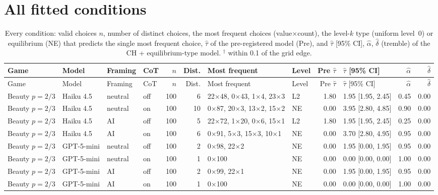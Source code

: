 \documentclass[11pt]{article}
\begin{document}
\section{All fitted conditions}\label{app:cells}
\footnotesize
\setlength{\tabcolsep}{1.8pt}
\begin{longtable}{@{}llllrrp{2.3cm}lrlrr@{}}
\caption{Every condition: valid choices $n$, number of distinct choices, the most frequent choices (value$\times$count), the level-$k$ type (uniform level~0) or equilibrium (NE) that predicts the single most frequent choice, $\hat\tau$ of the pre-registered model (Pre), and $\hat\tau$ [95\% CI], $\hat\alpha$, $\hat\delta$ (tremble) of the CH + equilibrium-type model. $^\dagger$ within 0.1 of the grid edge.}\label{tab:all}\\
\toprule
Game & Model & Framing & CoT & $n$ & Dist. & Most frequent & Level & Pre $\hat\tau$ & $\hat\tau$ [95\% CI] & $\hat\alpha$ & $\hat\delta$\\
\midrule\endfirsthead
\toprule
Game & Model & Framing & CoT & $n$ & Dist. & Most frequent & Level & Pre $\hat\tau$ & $\hat\tau$ [95\% CI] & $\hat\alpha$ & $\hat\delta$\\
\midrule\endhead
Beauty $p{=}2/3$ & Haiku 4.5 & neutral & off & 100 & 6 & 22$\times$48, 0$\times$43, 1$\times$4, 23$\times$3 & L2 & 1.80 & 1.95 [1.95, 2.45] & 0.45 & 0.00 \\
Beauty $p{=}2/3$ & Haiku 4.5 & neutral & on & 100 & 10 & 0$\times$87, 20$\times$3, 13$\times$2, 15$\times$2 & NE & 0.00 & 3.95 [2.80, 4.85] & 0.90 & 0.00 \\
Beauty $p{=}2/3$ & Haiku 4.5 & AI & off & 100 & 5 & 22$\times$72, 1$\times$20, 0$\times$6, 15$\times$1 & L2 & 1.80 & 1.95 [1.95, 2.45] & 0.25 & 0.00 \\
Beauty $p{=}2/3$ & Haiku 4.5 & AI & on & 100 & 6 & 0$\times$91, 5$\times$3, 15$\times$3, 10$\times$1 & NE & 0.00 & 3.70 [2.80, 4.95] & 0.95 & 0.00 \\
Beauty $p{=}2/3$ & GPT-5-mini & neutral & off & 100 & 2 & 0$\times$98, 22$\times$2 & NE & 0.00 & 1.95 [0.00, 1.95] & 0.95 & 0.00 \\
Beauty $p{=}2/3$ & GPT-5-mini & neutral & on & 100 & 1 & 0$\times$100 & NE & 0.00 & 0.00 [0.00, 0.00] & 1.00 & 0.00 \\
Beauty $p{=}2/3$ & GPT-5-mini & AI & off & 100 & 2 & 0$\times$99, 22$\times$1 & NE & 0.00 & 1.95 [0.00, 1.95] & 0.95 & 0.00 \\
Beauty $p{=}2/3$ & GPT-5-mini & AI & on & 100 & 1 & 0$\times$100 & NE & 0.00 & 0.00 [0.00, 0.00] & 1.00 & 0.00 \\

\end{longtable}
\end{document}
